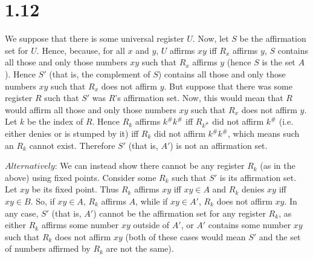 \documentclass{article}
\theoremstyle{definition}
\begin{document}
\section*{1.12}
We suppose that there is some universal register $U$. Now, let $S$ be the affirmation set for $U$. Hence, because, for all $x$ and $y$, 
$U$ affirms $xy$ iff $R_x$ affirms $y$, $S$ contains all those and only those numbers $xy$ such that $R_x$ affirms $y$ (hence $S$ is the set $A$). 
Hence $S'$ (that is, the complement of $S$) contains all those and only those numbers $xy$ such that $R_x$ does not affirm $y$. But suppose that there was 
some register $R$ such that $S'$ was $R$'s affirmation set. Now, this would mean that $R$ would affirm all those and only those numbers $xy$ such that 
$R_x$ does not affirm $y$. Let $k$ be the index of $R$. Hence $R_k$ affirms $k^\#k^\#$ iff $R_{k^\#}$ did not affirm $k^\#$ (i.e. either denies or 
is stumped by it) iff $R_k$ did not affirm $k^\#k^\#$, which means such an $R_k$ cannot exist. Therefore $S'$ (that is, $A'$) is not an affirmation set. 


$Alternatively$: We can instead show there cannot be any register $R_k$ (as in the above) using fixed points. Consider some $R_k$ such that $S'$ is 
its affirmation set. Let $xy$ be its fixed point. Thus $R_k$ affirms $xy$ iff $xy\in A$ and $R_k$ denies $xy$ iff $xy\in B$. 
So, if $xy\in A$, $R_k$ affirms $A$, while if $xy\in A'$, $R_k$ does not affirm $xy$. In any case, $S'$ (that is, $A'$) cannot be the affirmation set 
for any register $R_k$, as either $R_k$ affirms some number $xy$ outside of $A'$, or $A'$ contains some number $xy$ such that $R_k$ does not affirm $xy$ 
(both of these cases would mean $S'$ and the set of numbers affirmed by $R_k$ are not the same). 
\end{document}
